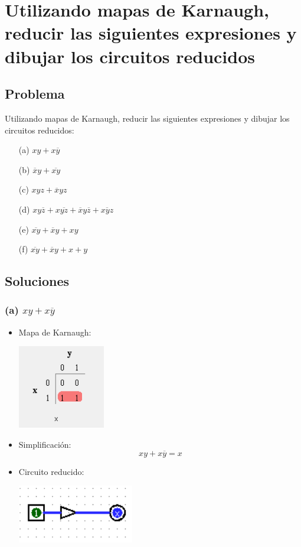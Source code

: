 \chapter*{Utilizando mapas de Karnaugh, reducir las siguientes expresiones y dibujar los circuitos reducidos}

\section*{Problema}
Utilizando mapas de Karnaugh, reducir las siguientes expresiones y dibujar los circuitos reducidos:

\begin{enumerate}
    \item[(a)] $xy + x\overline{y}$
    \item[(b)] $\overline{x}y + \overline{xy}$
    \item[(c)] $xyz + \overline{x}yz$
    \item[(d)] $xy\overline{z} + x\overline{yz} + \overline{x}y\overline{z} + \overline{xyz}$
    \item[(e)] $\overline{xy} + \overline{x}y + xy$
    \item[(f)] $\overline{xy} + \overline{x}y + x + y$
\end{enumerate}

\section*{Soluciones}

\subsection*{(a) $xy + x\overline{y}$}

\begin{itemize}
    \item Mapa de Karnaugh:
\begin{center}
    \includegraphics[width=0.3\textwidth]{recursos/Ejercicio3/mapas/mapa_a).png}
\end{center}

    \item Simplificación: \[ xy + x\overline{y} = x \]

    \item Circuito reducido:
\begin{center}
    \includegraphics[width=0.4\textwidth]{recursos/Ejercicio3/circuito/circuito_a).png}
\end{center}
\end{itemize}

